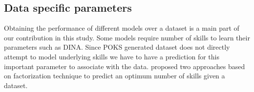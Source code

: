 


\subsection{Data specific parameters}

Obtaining the performance of different models over a dataset is a main part of our contribution in this study. Some models require number of skills to learn their parameters such as DINA. Since POKS generated dataset does not directly attempt to model underlying skills we have to have a prediction for this important parameter to associate with the data. \citet{Beheshti2012Numbers} proposed two approaches based on factorization technique to predict an optimum number of skills given a dataset. 


